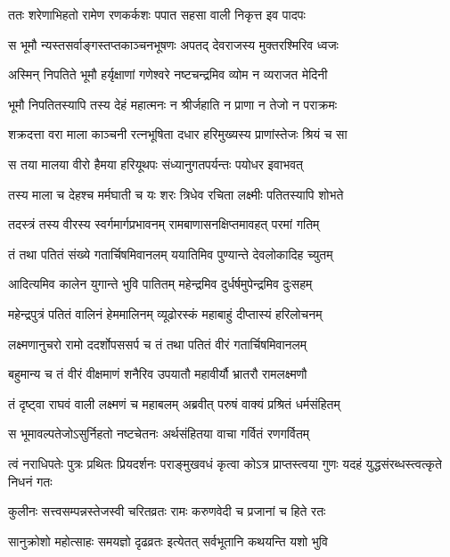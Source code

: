 
\twolineshloka
{ततः शरेणाभिहतो रामेण रणकर्कशः}
{पपात सहसा वाली निकृत्त इव पादपः} %

\twolineshloka
{स भूमौ न्यस्तसर्वाङ्गस्तप्तकाञ्चनभूषणः}
{अपतद् देवराजस्य मुक्तरश्मिरिव ध्वजः} %

\twolineshloka
{अस्मिन् निपतिते भूमौ हर्यृक्षाणां गणेश्वरे}
{नष्टचन्द्रमिव व्योम न व्यराजत मेदिनी} %

\twolineshloka
{भूमौ निपतितस्यापि तस्य देहं महात्मनः}
{न श्रीर्जहाति न प्राणा न तेजो न पराक्रमः} %

\twolineshloka
{शक्रदत्ता वरा माला काञ्चनी रत्नभूषिता}
{दधार हरिमुख्यस्य प्राणांस्तेजः श्रियं च सा} %

\twolineshloka
{स तया मालया वीरो हैमया हरियूथपः}
{संध्यानुगतपर्यन्तः पयोधर इवाभवत्} %

\twolineshloka
{तस्य माला च देहश्च मर्मघाती च यः शरः}
{त्रिधेव रचिता लक्ष्मीः पतितस्यापि शोभते} %

\twolineshloka
{तदस्त्रं तस्य वीरस्य स्वर्गमार्गप्रभावनम्}
{रामबाणासनक्षिप्तमावहत् परमां गतिम्} %

\twolineshloka
{तं तथा पतितं संख्ये गतार्चिषमिवानलम्}
{ययातिमिव पुण्यान्ते देवलोकादिह च्युतम्} %

\twolineshloka
{आदित्यमिव कालेन युगान्ते भुवि पातितम्}
{महेन्द्रमिव दुर्धर्षमुपेन्द्रमिव दुःसहम्} %

\twolineshloka
{महेन्द्रपुत्रं पतितं वालिनं हेममालिनम्}
{व्यूढोरस्कं महाबाहुं दीप्तास्यं हरिलोचनम्} %

\twolineshloka
{लक्ष्मणानुचरो रामो ददर्शोपससर्प च}
{तं तथा पतितं वीरं गतार्चिषमिवानलम्} %

\twolineshloka
{बहुमान्य च तं वीरं वीक्षमाणं शनैरिव}
{उपयातौ महावीर्यौ भ्रातरौ रामलक्ष्मणौ} %

\twolineshloka
{तं दृष्ट्वा राघवं वाली लक्ष्मणं च महाबलम्}
{अब्रवीत् परुषं वाक्यं प्रश्रितं धर्मसंहितम्} %

\twolineshloka
{स भूमावल्पतेजोऽसुर्निहतो नष्टचेतनः}
{अर्थसंहितया वाचा गर्वितं रणगर्वितम्} %

\threelineshloka
{त्वं नराधिपतेः पुत्रः प्रथितः प्रियदर्शनः}
{पराङ्मुखवधं कृत्वा कोऽत्र प्राप्तस्त्वया गुणः}
{यदहं युद्धसंरब्धस्त्वत्कृते निधनं गतः} %

\twolineshloka
{कुलीनः सत्त्वसम्पन्नस्तेजस्वी चरितव्रतः}
{रामः करुणवेदी च प्रजानां च हिते रतः} %

\twolineshloka
{सानुक्रोशो महोत्साहः समयज्ञो दृढव्रतः}
{इत्येतत् सर्वभूतानि कथयन्ति यशो भुवि} %

